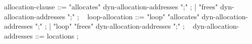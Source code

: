 \begin{syntax}
  { allocation-clause } ::= { "allocates" dyn-allocation-addresses ";" } ;
                      | { "frees" dyn-allocation-addresses ";" } ;
  \
  { loop-allocation } ::= { "loop" "allocates"  dyn-allocation-addresses ";" };
                    | { "loop" "frees"  dyn-allocation-addresses ";" };
  \
  { dyn-allocation-addresses } ::= { locations } ; 
 \end{syntax}
